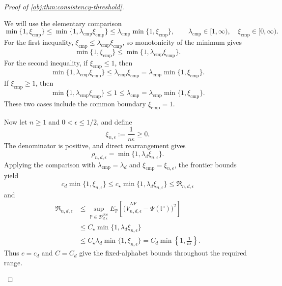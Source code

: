 \documentclass[11pt]{article}
\begin{document}
\begin{proof}[Proof of \cref{obj:thm:consistency-threshold}]
\begin{enumerate}
We will use the elementary comparison
\[
\min\{1,\xi_{\mathrm{cmp}}\}
\le \min\{1,\lambda_{\mathrm{cmp}}\xi_{\mathrm{cmp}}\}
\le \lambda_{\mathrm{cmp}}\min\{1,\xi_{\mathrm{cmp}}\},
\qquad
\lambda_{\mathrm{cmp}}\in[1,\infty),\quad
\xi_{\mathrm{cmp}}\in[0,\infty).
\]
For the first inequality,
\(\xi_{\mathrm{cmp}}\le\lambda_{\mathrm{cmp}}\xi_{\mathrm{cmp}}\), so monotonicity of the minimum gives
\[
\min\{1,\xi_{\mathrm{cmp}}\}
\le\min\{1,\lambda_{\mathrm{cmp}}\xi_{\mathrm{cmp}}\}.
\]
For the second inequality, if \(\xi_{\mathrm{cmp}}\le1\), then
\[
\min\{1,\lambda_{\mathrm{cmp}}\xi_{\mathrm{cmp}}\}
\le\lambda_{\mathrm{cmp}}\xi_{\mathrm{cmp}}
=\lambda_{\mathrm{cmp}}\min\{1,\xi_{\mathrm{cmp}}\}.
\]
If \(\xi_{\mathrm{cmp}}\ge1\), then
\[
\min\{1,\lambda_{\mathrm{cmp}}\xi_{\mathrm{cmp}}\}
\le1\le\lambda_{\mathrm{cmp}}
=\lambda_{\mathrm{cmp}}\min\{1,\xi_{\mathrm{cmp}}\}.
\]
These two cases include the common boundary \(\xi_{\mathrm{cmp}}=1\).

Now let \(n\ge1\) and \(0<\epsilon\le1/2\), and define
\[
\xi_{n,\epsilon}:=\frac{1}{n\epsilon}\ge0.
\]
The denominator is positive, and direct rearrangement gives
\[
\rho_{n,d,\epsilon}
=\min\{1,\lambda_d\xi_{n,\epsilon}\}.
\]
Applying the comparison with
\(\lambda_{\mathrm{cmp}}=\lambda_d\) and
\(\xi_{\mathrm{cmp}}=\xi_{n,\epsilon}\), the frontier bounds yield
\[
c_d\min\{1,\xi_{n,\epsilon}\}
\le c_\star\min\{1,\lambda_d\xi_{n,\epsilon}\}
\le\mathfrak R_{n,d,\epsilon}
\]
and
\[
\begin{aligned}
\mathfrak R_{n,d,\epsilon}
&\le
\sup_{\mathbb P\in\mathcal D_{d,\epsilon}^{\mathrm{obs}}}
E_{\mathbb P}\!\left[
\bigl(\widehat V_{n,d,\epsilon}^{\mathrm{AF}}-\Psi(\mathbb P)\bigr)^2
\right]\\
&\le C_\star\min\{1,\lambda_d\xi_{n,\epsilon}\}\\
&\le C_\star\lambda_d\min\{1,\xi_{n,\epsilon}\}
=C_d\min\left\{1,\frac{1}{n\epsilon}\right\}.
\end{aligned}
\]
Thus \(c=c_d\) and \(C=C_d\) give the fixed-alphabet bounds throughout the required range.


\end{enumerate}
\end{proof}
\end{document}
